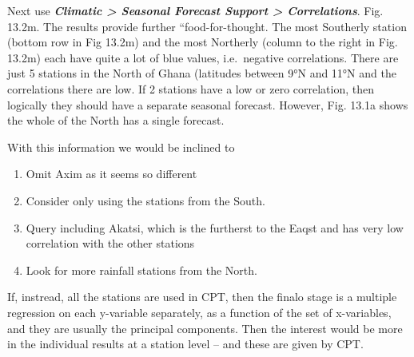 \documentclass[
  letterpaper,
  DIV=11,
  numbers=noendperiod]{scrreprt}
\begin{document}
Next use \textbf{\emph{Climatic \textgreater{} Seasonal Forecast Support
\textgreater{} Correlations}}. Fig. 13.2m. The results provide further
``food-for-thought. The most Southerly station (bottom row in Fig 13.2m)
and the most Northerly (column to the right in Fig. 13.2m) each have
quite a lot of blue values, i.e.~negative correlations. There are just 5
stations in the North of Ghana (latitudes between 9°N and 11°N and the
correlations there are low. If 2 stations have a low or zero
correlation, then logically they should have a separate seasonal
forecast. However, Fig. 13.1a shows the whole of the North has a single
forecast.

With this information we would be inclined to

\begin{enumerate}
\def\labelenumi{\alph{enumi})}
\item
  Omit Axim as it seems so different
\item
  Consider only using the stations from the South.
\item
  Query including Akatsi, which is the furtherst to the Eaqst and has
  very low correlation with the other stations
\item
  Look for more rainfall stations from the North.
\end{enumerate}

If, instread, all the stations are used in CPT, then the finalo stage is
a multiple regression on each y-variable separately, as a function of
the set of x-variables, and they are usually the principal components.
Then the interest would be more in the individual results at a station
level -- and these are given by CPT.
\end{document}
